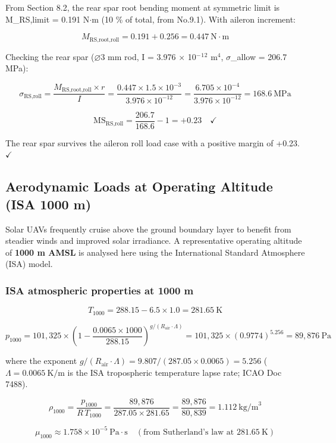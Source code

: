 \documentclass[10pt,a4paper]{article}
\begin{document}
From Section 8.2, the rear spar root bending moment at symmetric limit is M\_RS,limit = 0.191 N${\cdot}$m (10 \% of total, from No.9.1). With aileron increment:

\[
M_{\text{RS,root,roll}} = 0.191 + 0.256 = 0.447\ \text{N}\cdot\text{m}
\]

Checking the rear spar ($\varnothing$3 mm rod, I = 3.976 ${\times}$ 10$^{-}$$^{1}$$^{2}$ m$^{4}$, ${\sigma}$\_allow = 206.7 MPa):

\[
\sigma_{\text{RS,roll}} = \frac{M_{\text{RS,root,roll}} \times r}{I} = \frac{0.447 \times 1.5 \times 10^{-3}}{3.976 \times 10^{-12}} = \frac{6.705 \times 10^{-4}}{3.976 \times 10^{-12}} = 168.6\ \text{MPa}
\]

\[
\text{MS}_{\text{RS,roll}} = \frac{206.7}{168.6} - 1 = +0.23 \quad \checkmark
\]

The rear spar survives the aileron roll load case with a positive margin of +0.23. $\checkmark $


\subsection{Aerodynamic Loads at Operating Altitude (ISA 1000 m)}


Solar UAVs frequently cruise above the ground boundary layer to benefit from steadier winds and improved solar irradiance. A representative operating altitude of \textbf{1000 m AMSL} is analysed here using the International Standard Atmosphere (ISA) model.


\subsubsection{ISA atmospheric properties at 1000 m}


\[
T_{1000} = 288.15 - 6.5 \times 1.0 = 281.65\ \text{K}
\]

\[
p_{1000} = 101{,}325 \times \left(1 - \frac{0.0065 \times 1000}{288.15}\right)^{g/(R_{\text{air}} \cdot \Lambda)} = 101{,}325 \times (0.9774)^{5.256} = 89{,}876\ \text{Pa}
\]

where the exponent $g/(R_{\text{air}} \cdot \Lambda) = 9.807/(287.05 \times 0.0065) = 5.256$ ($\Lambda = 0.0065\ \text{K/m}$ is the ISA tropospheric temperature lapse rate; ICAO Doc 7488).

\[
\rho_{1000} = \frac{p_{1000}}{R\,T_{1000}} = \frac{89{,}876}{287.05 \times 281.65} = \frac{89{,}876}{80{,}839} = 1.112\ \text{kg/m}^3
\]

\[
\mu_{1000} \approx 1.758 \times 10^{-5}\ \text{Pa}\cdot\text{s} \quad (\text{from Sutherland's law at } 281.65\ \text{K})
\]
\end{document}
